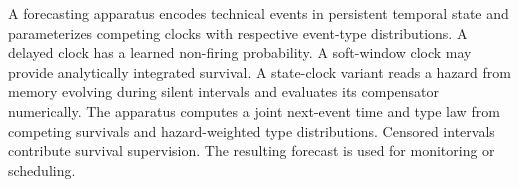 \documentclass[pct]{sm-patent}
\begin{document}
\abstractstart

A forecasting apparatus encodes technical events in persistent temporal state and parameterizes competing clocks with respective event-type distributions. A delayed clock has a learned non-firing probability. A soft-window clock may provide analytically integrated survival. A state-clock variant reads a hazard from memory evolving during silent intervals and evaluates its compensator numerically. The apparatus computes a joint next-event time and type law from competing survivals and hazard-weighted type distributions. Censored intervals contribute survival supervision. The resulting forecast is used for monitoring or scheduling.
\end{document}
